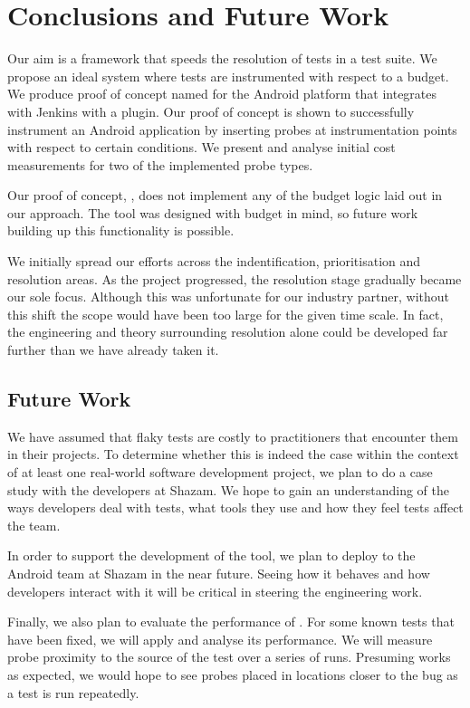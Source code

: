 \section{Conclusions and Future Work}
\label{sec:conc}

Our aim is a framework that speeds the resolution of \flaky tests in a test
suite. We propose an ideal system where tests are instrumented with respect to a
budget. We produce proof of concept named for the Android platform that
integrates with Jenkins with a plugin. Our proof of concept is shown to
successfully instrument an Android application by inserting probes at
instrumentation points with respect to certain conditions. We present and
analyse initial cost measurements for two of the implemented probe types.

Our proof of concept, \venera, does not implement any of the budget logic laid
out in our approach. The tool was designed with budget in mind, so future work
building up this functionality is possible.

We initially spread our efforts across the indentification, prioritisation and
resolution areas. As the project progressed, the resolution stage gradually
became our sole focus. Although this was unfortunate for our industry partner,
without this shift the scope would have been too large for the given time scale.
In fact, the engineering and theory surrounding resolution alone could be
developed far further than we have already taken it.


\subsection{Future Work}

We have assumed that flaky tests are costly to practitioners that encounter them
in their projects. To determine whether this is indeed the case within the
context of at least one real-world software development project, we plan to do a
case study with the developers at Shazam. We hope to gain an understanding of
the ways developers deal with \flaky tests, what tools they use and how they
feel \flaky tests affect the team.

In order to support the development of the tool, we plan to deploy \venera to
the Android team at Shazam in the near future. Seeing how it behaves and how
developers interact with it will be critical in steering the engineering work.

Finally, we also plan to evaluate the performance of \venera. For some known
\flaky tests that have been fixed, we will apply \venera and analyse its
performance. We will measure probe proximity to the source of the \flaky test
over a series of runs. Presuming \venera works as expected, we would hope to
see probes placed in locations closer to the bug as a test is run repeatedly.

